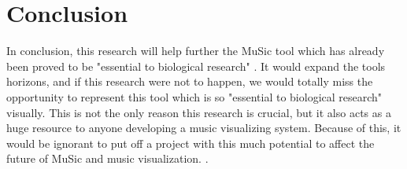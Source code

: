 \documentclass[11pt]{article}
\begin{document}
\vspace*{-.1in}
\section{Conclusion}
\label{sec:conclusion}
\vspace*{-.1in}

In conclusion, this research will help further the MuSic tool which has already been proved to be "essential to biological research" \cite{}. It would expand the tools horizons, and if this research were not to happen, we would totally miss the opportunity to represent this tool which is so "essential to biological research" visually. This is not the only reason this research is crucial, but it also acts as a huge resource to anyone developing a music visualizing system. Because of this, it would be ignorant to put off a project with this much potential to affect the future of MuSic and music visualization.
 \cite{jia2011analysis}.



\end{document}
